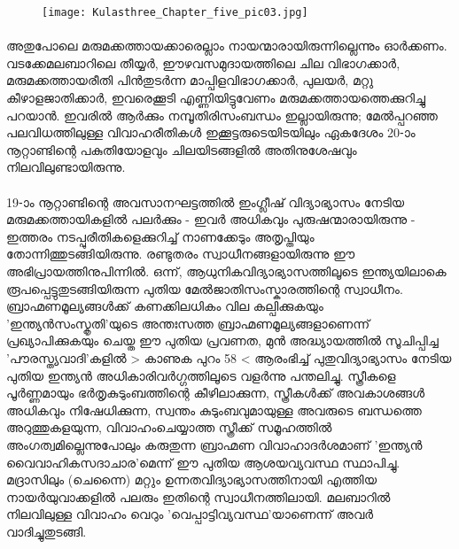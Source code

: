 \begin{figure}[h]
\begin{center}
\texttt{[image: Kulasthree\_Chapter\_five\_pic03.jpg]}
\end{center}
\end{figure}

\paragraph{}അതുപോലെ മരുമക്കത്തായക്കാരെല്ലാം നായന്മാരായിരുന്നില്ലെന്നും ഓർക്കണം. വടക്കേമലബാറിലെ തീയ്യർ, ഈഴവസമുദായത്തിലെ ചില വിഭാഗക്കാർ, മരുമക്കത്തായരീതി പിൻതുടർന്ന മാപ്പിളവിഭാഗക്കാർ, പുലയർ, മറ്റു കീഴാളജാതിക്കാർ, ഇവരെക്കൂടി എണ്ണിയിട്ടുവേണം മരുമക്കത്തായത്തെക്കുറിച്ചു പറയാൻ. ഇവരിൽ ആർക്കും നമ്പൂതിരിസംബന്ധം ഇല്ലായിരുന്നു; മേൽപ്പറഞ്ഞ പലവിധത്തിലുള്ള വിവാഹരീതികൾ ഇക്കൂട്ടരുടെയിടയിലും ഏകദേശം 20-ാം നൂറ്റാണ്ടിന്റെ പകുതിയോളവും ചിലയിടങ്ങളിൽ അതിനുശേഷവും നിലവിലുണ്ടായിരുന്നു.

\paragraph{}19-ാം നൂറ്റാണ്ടിന്റെ അവസാനഘട്ടത്തിൽ ഇംഗ്ലീഷ് വിദ്യാഭ്യാസം നേടിയ മരുമക്കത്തായികളിൽ പലർക്കും - ഇവർ അധികവും പുരുഷന്മാരായിരുന്നു - ഇത്തരം നടപ്പുരീതികളെക്കുറിച്ച് നാണക്കേടും അതൃപ്തിയും തോന്നിത്തുടങ്ങിയിരുന്നു. രണ്ടുതരം സ്വാധീനങ്ങളായിരുന്നു ഈ അഭിപ്രായത്തിനുപിന്നിൽ. ഒന്ന്, ആധുനികവിദ്യാഭ്യാസത്തിലൂടെ ഇന്ത്യയിലാകെ രൂപപ്പെട്ടുതുടങ്ങിയിരുന്ന പുതിയ മേൽജാതിസംസ്കാരത്തിന്റെ സ്വാധീനം. ബ്രാഹ്മണമൂല്യങ്ങൾക്ക് കണക്കിലധികം വില കല്പിക്കുകയും 'ഇന്ത്യൻസംസ്കൃതി'യുടെ അന്തഃസത്ത ബ്രാഹ്മണമൂല്യങ്ങളാണെന്ന് പ്രഖ്യാപിക്കുകയും ചെയ്ത ഈ പുതിയ പ്രവണത, മുൻ അദ്ധ്യായത്തിൽ സൂചിപ്പിച്ച 'പൗരസ്ത്യവാദി'കളിൽ > കാണുക പുറം 58 < ആരംഭിച്ച് പുതുവിദ്യാഭ്യാസം നേടിയ പുതിയ ഇന്ത്യൻ അധികാരിവർഗ്ഗത്തിലൂടെ വളർന്നു പന്തലിച്ചു. സ്ത്രീകളെ പൂർണ്ണമായും ഭർതൃകുടുംബത്തിന്റെ കീഴിലാക്കുന്ന, സ്ത്രീകൾക്ക് അവകാശങ്ങൾ അധികവും നിഷേധിക്കുന്ന, സ്വന്തം കുടുംബവുമായുള്ള അവരുടെ ബന്ധത്തെ അറുത്തുകളയുന്ന, വിവാഹംചെയ്യാത്ത സ്ത്രീക്ക് സമൂഹത്തിൽ അംഗത്വമില്ലെന്നുപോലും കരുതുന്ന ബ്രാഹ്മണ വിവാഹാദർശമാണ് 'ഇന്ത്യൻ വൈവാഹികസദാചാര'മെന്ന് ഈ പുതിയ ആശയവ്യവസ്ഥ സ്ഥാപിച്ചു. മദ്രാസിലും (ചെന്നൈ) മറ്റും ഉന്നതവിദ്യാഭ്യാസത്തിനായി എത്തിയ നായർയുവാക്കളിൽ പലരും ഇതിന്റെ സ്വാധീനത്തിലായി. മലബാറിൽ നിലവിലുള്ള വിവാഹം വെറും 'വെപ്പാട്ടിവ്യവസ്ഥ'യാണെന്ന് അവർ വാദിച്ചുതുടങ്ങി.

